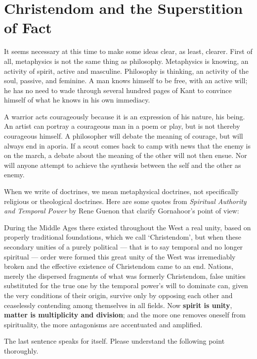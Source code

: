 \section{Christendom and the Superstition of Fact}

It seems necessary at this time to make some ideas clear, as least, clearer. First of all, metaphysics is not the same thing as philosophy. Metaphysics is knowing, an activity of spirit, active and masculine. Philosophy is thinking, an activity of the soul, passive, and feminine. A man knows himself to be free, with an active will; he has no need to wade through several hundred pages of Kant to convince himself of what he knows in his own immediacy.

A warrior acts courageously because it is an expression of his nature, his being. An artist can portray a courageous man in a poem or play, but is not thereby courageous himself. A philosopher will debate the meaning of courage, but will always end in aporia. If a scout comes back to camp with news that the enemy is on the march, a debate about the meaning of the other will not then ensue. Nor will anyone attempt to achieve the synthesis between the self and the other as enemy.

When we write of doctrines, we mean metaphysical doctrines, not specifically religious or theological doctrines. Here are some quotes from \emph{Spiritual Authority and Temporal Power} by Rene Guenon that clarify Gornahoor's point of view:

\begin{quotex}
During the Middle Ages there existed throughout the West a real unity, based on properly traditional foundations, which we call `Christendom', but when these secondary unities of a purely political --- that is to say temporal and no longer spiritual --- order were formed this great unity of the West was irremediably broken and the effective existence of Christendom came to an end. Nations, merely the dispersed fragments of what was formerly Christendom, false unities substituted for the true one by the temporal power's will to dominate can, given the very conditions of their origin, survive only by opposing each other and ceaselessly contending among themselves in all fields. Now \textbf{spirit is unity}, \textbf{matter is multiplicity and division}; and the more one removes oneself from spirituality, the more antagonisms are accentuated and amplified.
\end{quotex}


The last sentence speaks for itself. Please understand the following point thoroughly.


